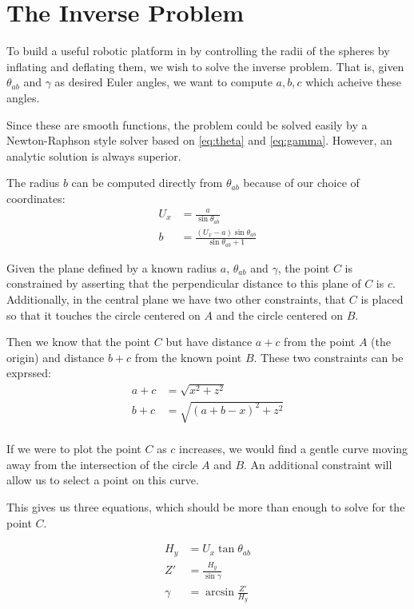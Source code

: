 \documentclass{article}
\begin{document}
\section{The Inverse Problem}

To build a useful robotic platform in by controlling the radii of the
spheres by inflating and deflating them, we wish to solve the inverse
problem. That is, given $\theta_{ab}$ and $\gamma$ as desired Euler
angles, we want to compute $a,b,c$ which acheive these angles.

Since these are smooth functions, the problem could be solved
easily by a Newton-Raphson style solver based on \ref{eq:theta} and \ref{eq:gamma}. However, an analytic solution is always superior.




The radius $b$ can be computed directly from $\theta_{ab}$
because of our choice of coordinates:
\begin{align}
  U_x &= \frac{a}{\sin{\theta_{ab}}} \\
  b &= \frac{(U_x - a)\sin{\theta_{ab}}}{\sin{\theta_{ab}}+1}
\end{align}

\newcommand{\abs}[1]{ \left\lvert#1\right\rvert}

Given the plane defined by a known radius $a$, $\theta_{ab}$ and $\gamma$, the point $C$ is constrained by asserting that the perpendicular
distance to this plane of $C$ is $c$.
Additionally, in the central plane we have two other constraints,
that $C$ is placed so that it touches the circle centered on $A$ and
the circle centered on $B$.

Then we know that the point $C$ but have distance $a+c$ from
the point $A$ (the origin) and distance $b+c$ from the known
point $B$. These two constraints can be exprssed:
\begin{align}
a + c &= \sqrt{x^2 + z ^2} \label{eq:a_constraint}\\
b + c &= \sqrt{(a+b-x)^2 + z^2} \label{eq:b_constraint} \\
\end{align}

If we were to plot the point $C$ as $c$ increases, we
would find a gentle curve moving away from the intersection
of the circle $A$ and $B$. An additional constraint will
allow us to select a point on this curve.

This gives us three equations, which
should be more than enough to solve for the point $C$.

\begin{align}
  H_y &= U_x \tan{\theta_{ab}} \\
  Z' &= \frac{H_y}{\sin{\gamma}} \\
  \gamma &= \arcsin{\frac{Z'}{H_y}} \label{eq:gamma} \\
\end{align}
\end{document}
